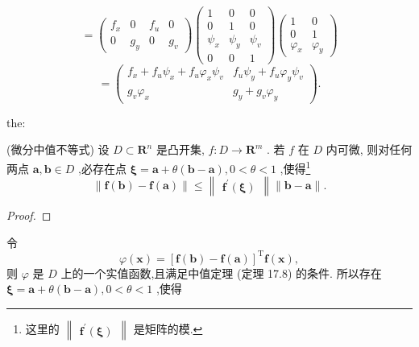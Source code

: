 \[
= \left( \begin{matrix} {f}_{x} & 0 & {f}_{u} & 0 \\  0 & {g}_{y} & 0 & {g}_{v} \end{matrix}\right) \left( \begin{matrix} 1 & 0 & 0 \\  0 & 1 & 0 \\  {\psi }_{x} & {\psi }_{y} & {\psi }_{v} \\  0 & 0 & 1 \end{matrix}\right) \left( \begin{matrix} 1 & 0 \\  0 & 1 \\  {\varphi }_{x} & {\varphi }_{y} \end{matrix}\right)
\]
\[
= \left( \begin{matrix} {f}_{x} + {f}_{u}{\psi }_{x} + {f}_{u}{\varphi }_{x}{\psi }_{v} & {f}_{u}{\psi }_{y} + {f}_{u}{\varphi }_{y}{\psi }_{v} \\  {g}_{v}{\varphi }_{x} & {g}_{y} + {g}_{v}{\varphi }_{y} \end{matrix}\right) .
\]
\begin{theorem}{}{the:}

\end{theorem}
 (微分中值不等式) 设 \(D \subset  {\mathbf{R}}^{n}\) 是凸开集, \(f : D \rightarrow  {\mathbf{R}}^{m}\) . 若 \(f\) 在 \(D\) 内可微, 则对任何两点 \(\mathbf{a},\mathbf{b} \in  D\) ,必存在点 \(\mathbf{\xi } = \mathbf{a} + \theta \left( {\mathbf{b} - \mathbf{a}}\right) ,0 < \theta  < 1\) ,使得\footnote{这里的 \(\begin{Vmatrix}{{\mathbf{f}}^{\prime }\left( \mathbf{\xi }\right) }\end{Vmatrix}\) 是矩阵的模.}
\[
\parallel \mathbf{f}\left( \mathbf{b}\right)  - \mathbf{f}\left( \mathbf{a}\right) \parallel  \leq  \begin{Vmatrix}{{\mathbf{f}}^{\prime }\left( \mathbf{\xi }\right) }\end{Vmatrix}\parallel \mathbf{b} - \mathbf{a}\parallel . \tag{18}
\]
\begin{proof}

\end{proof}
令
\[
\varphi \left( \mathbf{x}\right)  = {\left\lbrack  \mathbf{f}\left( \mathbf{b}\right)  - \mathbf{f}\left( \mathbf{a}\right) \right\rbrack  }^{\mathrm{T}}\mathbf{f}\left( \mathbf{x}\right) ,
\]
则 \(\varphi\) 是 \(D\) 上的一个实值函数,且满足中值定理 (定理 17.8) 的条件. 所以存在 \(\mathbf{\xi } = \mathbf{a} + \theta \left( {\mathbf{b} - \mathbf{a}}\right) ,0 < \theta  < 1\) ,使得
